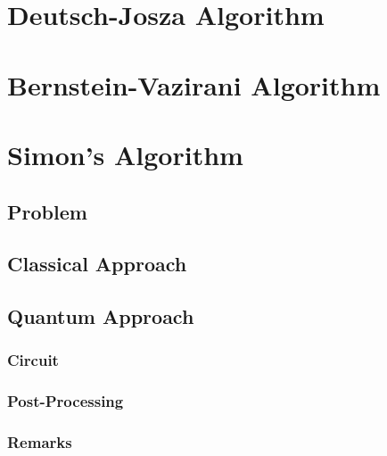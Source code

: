 	\section{Deutsch-Josza Algorithm} %
		\label{sec:deutschJosza}


	\section{Bernstein-Vazirani Algorithm} %
		\label{sec:bernsteinVazirani}


	\section{Simon's Algorithm} %
		\label{sec:simons}


		\subsection{Problem} %

		\subsection{Classical Approach} %

		\subsection{Quantum Approach} %

			\subsubsection{Circuit} %

			\subsubsection{Post-Processing} %

			\subsubsection{Remarks} %

